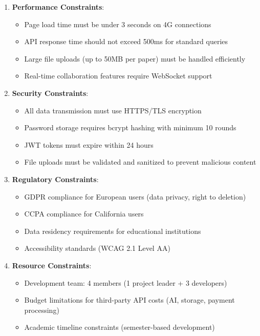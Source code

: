 \begin{enumerate}
    \item \textbf{Performance Constraints}:
          \begin{itemize}
              \item Page load time must be under 3 seconds on 4G connections
              \item API response time should not exceed 500ms for standard queries
              \item Large file uploads (up to 50MB per paper) must be handled efficiently
              \item Real-time collaboration features require WebSocket support
          \end{itemize}

    \item \textbf{Security Constraints}:
          \begin{itemize}
              \item All data transmission must use HTTPS/TLS encryption
              \item Password storage requires bcrypt hashing with minimum 10 rounds
              \item JWT tokens must expire within 24 hours
              \item File uploads must be validated and sanitized to prevent malicious content
          \end{itemize}

    \item \textbf{Regulatory Constraints}:
          \begin{itemize}
              \item GDPR compliance for European users (data privacy, right to deletion)
              \item CCPA compliance for California users
              \item Data residency requirements for educational institutions
              \item Accessibility standards (WCAG 2.1 Level AA)
          \end{itemize}

    \item \textbf{Resource Constraints}:
          \begin{itemize}
              \item Development team: 4 members (1 project leader + 3 developers)
              \item Budget limitations for third-party API costs (AI, storage, payment processing)
              \item Academic timeline constraints (semester-based development)
          \end{itemize}


\end{enumerate}
